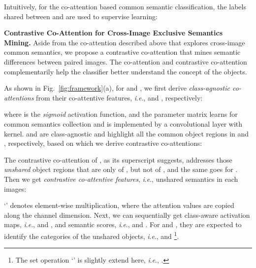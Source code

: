 \documentclass[runningheads]{llncs}
\newcommand{\ie}{\textit{i}.\textit{e}.}
\begin{document}
Intuitively, for the co-attention based common semantic classification, the labels  shared between  and  are used to supervise learning:








\noindent\textbf{Contrastive Co-Attention for Cross-Image Exclusive Semantics Mining.} Aside from the co-attention described above that explores cross-image common semantics, we propose a
contrastive co-attention that mines semantic differences  between paired images. The co-attention and contrastive co-attention complementarily help the classifier better understand the concept of the objects.

As shown in Fig.~\ref{fig:framework}(a), for  and , we first derive \textit{class-agnostic co-attentions} from their  co-attentive features, \ie,   and , respectively:

where  is the \textit{sigmoid} activation function, and the parameter matrix  learns for common semantics collection and is implemented by a convolutional layer with  kernel.  and  are class-agnostic and highlight all the common object regions in  and , respectively, based on which we derive contrastive co-attentions:

The contrastive co-attention  of , as its superscript suggests, addresses those \textit{unshared}  object regions that are only of , but not of , and the same goes for . Then we get \textit{contrastive co-attentive features}, \ie, unshared semantics in each images:

`' denotes element-wise multiplication, where the attention values are copied along the channel dimension.
Next, we can sequentially get class-aware activation maps, \ie,  and , and semantic scores, \ie,  and . For  and , they are expected to identify the categories of the unshared objects, \ie,   and \footnote{The set operation `' is slightly extend here, \ie, .}.
\end{document}
